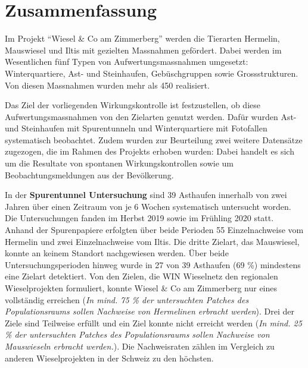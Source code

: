 \documentclass[
  oneside]{scrbook}
\let\oldmaketitle\maketitle
\begin{document}
\let\maketitle\oldmaketitle



{
\setcounter{tocdepth}{1}
\tableofcontents
}
\hypertarget{zusammenfassung}{%
\chapter*{Zusammenfassung}\label{zusammenfassung}}

Im Projekt ``Wiesel \& Co am Zimmerberg'' werden die Tierarten Hermelin, Mauswiesel und Iltis mit gezielten Massnahmen gefördert. Dabei werden im Wesentlichen fünf Typen von Aufwertungsmassnahmen umgesetzt: Winterquartiere, Ast- und Steinhaufen, Gebüschgruppen sowie Grossstrukturen. Von diesen Massnahmen wurden mehr als 450 realisiert.

Das Ziel der vorliegenden Wirkungskontrolle ist festzustellen, ob diese Aufwertungsmassnahmen von den Zielarten genutzt werden. Dafür wurden Ast- und Steinhaufen mit Spurentunneln und Winterquartiere mit Fotofallen systematisch beobachtet. Zudem wurden zur Beurteilung zwei weitere Datensätze zugezogen, die im Rahmen des Projekts erhoben wurden: Dabei handelt es sich um die Resultate von spontanen Wirkungskontrollen sowie um Beobachtungsmeldungen aus der Bevölkerung.

In der \textbf{Spurentunnel Untersuchung} sind 39 Asthaufen innerhalb von zwei Jahren über einen Zeitraum von je 6 Wochen systematisch untersucht worden. Die Untersuchungen fanden im Herbst 2019 sowie im Frühling 2020 statt. Anhand der Spurenpapiere erfolgten über beide Perioden 55 Einzelnachweise vom Hermelin und zwei Einzelnachweise vom Iltis. Die dritte Zielart, das Mauswiesel, konnte an keinem Standort nachgewiesen werden. Über beide Untersuchungsperioden hinweg wurde in 27 von 39 Asthaufen (69 \%) mindestens eine Zielart detektiert. Von den Zielen, die WIN Wieselnetz den regionalen Wieselprojekten formuliert, konnte Wiesel \& Co am Zimmerberg nur eines vollständig erreichen (\emph{In mind. 75 \% der untersuchten Patches des Populationsraums sollen Nachweise von Hermelinen erbracht werden}). Drei der Ziele sind Teilweise erfüllt und ein Ziel konnte nicht erreicht werden (\emph{In mind. 25 \% der untersuchten Patches des Populationsraums sollen Nachweise von Mauswieseln erbracht werden.}). Die Nachweisraten zählen im Vergleich zu anderen Wieselprojekten in der Schweiz zu den höchsten.
\end{document}
